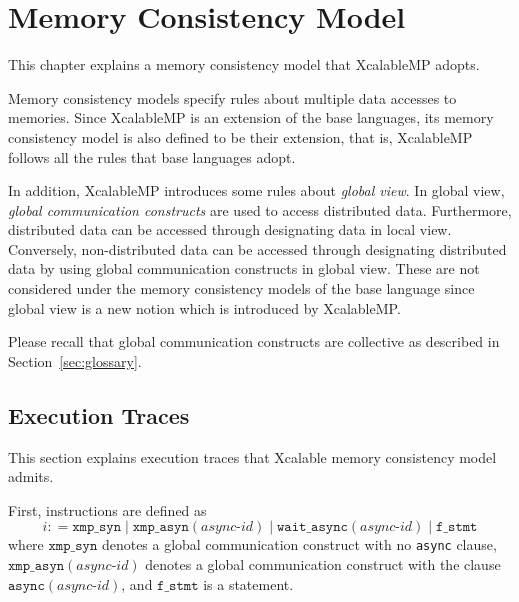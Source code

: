 \chapter{Memory Consistency Model}

\newcommand{\Coloneqq}{\mathrel{\colon\!=}}
\newcommand{\xsync}{\texttt{xmp\_syn}}
\newcommand{\xasync}[1]{\texttt{xmp\_asyn}(#1)}
\newcommand{\waitasync}[1]{\texttt{wait\_async}(#1)}
\newcommand{\fstmt}{\texttt{f\_stmt}}
\newcommand{\F}[2]{\texttt{Fetch}^{#1} \: {#2}}
\newcommand{\E}[2]{\texttt{Execute}^{#1} \: {#2}}
\newcommand{\R}[2]{\texttt{Reflect}^{#1} \: {#2}}



This chapter explains a memory consistency model that XcalableMP adopts.

Memory consistency models specify rules about multiple data accesses
to memories.  Since XcalableMP is an extension of the base languages,
its memory consistency model is also defined to be their extension,
that is, XcalableMP follows all the rules that base languages adopt.

In addition, XcalableMP introduces some rules about \emph{global
  view}.  In global view, \emph{global communication constructs} are
used to access distributed data.  Furthermore, distributed data can be
accessed through designating data in local view.  Conversely,
non-distributed data can be accessed through designating distributed
data by using global communication constructs in global view.  These
are not considered under the memory consistency models of the base
language since global view is a new notion which is introduced by
XcalableMP.

Please recall that global communication constructs are collective as
described in Section~\ref{sec:glossary}.

\section{Execution Traces}

This section explains execution traces that Xcalable memory
consistency model admits.

First, instructions are defined as
\[
i \Coloneqq \xsync \mid \xasync{\textit{async-id}} \mid \waitasync{\textit{async-id}} \mid \fstmt
\]
where $\xsync$ denotes a global communication construct with no
\texttt{async} clause, $\xasync{\textit{async-id}}$ denotes a global
communication construct with the clause
$\texttt{async}(\textit{async-id})$,
and $\fstmt$ is a statement.

